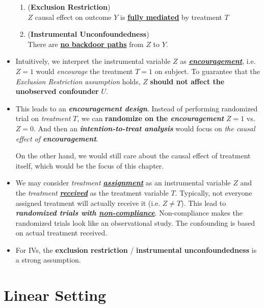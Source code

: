 \documentclass[11pt]{article}
\begin{document}
\begin{itemize}
\begin{enumerate}
\item  \begin{assumption} (\textbf{Exclusion Restriction})\\
 $Z$ causal effect on outcome $Y$ is \underline{\textbf{fully mediated}} by treatment $T$
\end{assumption}

\item  \begin{assumption} (\textbf{Instrumental Unconfoundedness})\\
There are \underline{\textbf{no backdoor paths}} from $Z$ to $Y$.
\end{assumption}
\end{enumerate}

\item Intuitively, we interpret the instrumental variable $Z$ as \underline{\textbf{\emph{encouragement}}}, i.e. $Z=1$ would \emph{encourage} the treatment $T=1$ on subject. To guarantee that the \emph{Exclusion Restriction assumption} holds, $Z$ \textbf{should not affect the unobserved confounder} $U$. 

\item This leads to an \emph{\textbf{encouragement design}}. Instead of performing randomized trial on \emph{treatment} $T$, we can \textbf{randomize on the \emph{encouragement}} $Z=1$ vs. $Z=0$. And then an \textbf{\emph{intention-to-treat analysis}} would focus on \emph{the causal effect of \textbf{encouragement}}. 

On the other hand, we would still care about the causal effect of treatment itself, which would be the focus of this chapter.

\item We may consider \emph{treatment \underline{\textbf{assignment}}} as an instrumental variable $Z$ and the \emph{treatment \underline{\textbf{received}}} as the treatment variable $T$. Typically, not everyone assigned treatment will actually receive it (i.e. $Z\neq T$). This lead to \textbf{\emph{randomized trials with \underline{non-compliance}}}. Non-compliance makes the randomized trials look like an observational study. The confounding is based on actual treatment received.

\item For IVs, the \textbf{exclusion restriction} / \textbf{instrumental unconfoundedness} is a strong assumption.
\end{itemize}

\section{Linear Setting}
\end{document}
